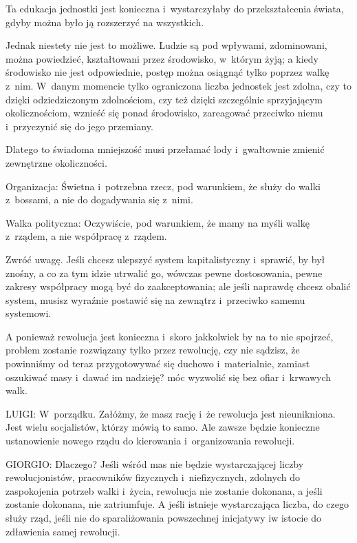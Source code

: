 \documentclass[oneside,polish,11pt,sfheadings]{mwbk}
\begin{document}
 
Ta edukacja jednostki jest konieczna i~wystarczyłaby do przekształcenia świata, gdyby można było ją rozszerzyć na
wszystkich. 

 
Jednak niestety nie jest to możliwe. Ludzie są pod wpływami, zdominowani, można powiedzieć, kształtowani przez
środowisko, w~którym żyją; a kiedy środowisko nie jest odpowiednie, postęp można osiągnąć tylko poprzez walkę z~nim. W~danym momencie tylko ograniczona liczba jednostek jest zdolna, czy to dzięki odziedziczonym zdolnościom, czy też dzięki
szczególnie sprzyjającym okolicznościom, wznieść się ponad środowisko, zareagować przeciwko niemu i~przyczynić się do
jego przemiany. 

 
Dlatego to świadoma mniejszość musi przełamać lody i~gwałtownie zmienić zewnętrzne okoliczności. 

 
Organizacja: Świetna i~potrzebna rzecz, pod warunkiem, że służy do walki z~bossami, a nie do dogadywania się z~nimi. 

 
Walka polityczna: Oczywiście, pod warunkiem, że mamy na myśli walkę z~rządem, a nie współpracę z~rządem. 

 
Zwróć uwagę. Jeśli chcesz ulepszyć system kapitalistyczny i~sprawić, by był znośny, a co za tym idzie utrwalić go,
wówczas pewne dostosowania, pewne zakresy współpracy mogą być do zaakceptowania; ale jeśli naprawdę chcesz obalić
system, musisz wyraźnie postawić się na zewnątrz i~przeciwko samemu systemowi. 

 
A ponieważ rewolucja jest konieczna i~skoro jakkolwiek by na to nie spojrzeć, problem zostanie rozwiązany tylko przez
rewolucję, czy nie sądzisz, że powinniśmy od teraz przygotowywać się duchowo i~materialnie, zamiast oszukiwać masy i~dawać im nadzieję? móc wyzwolić się bez ofiar i~krwawych walk. 




 
\noindent LUIGI: W~porządku. Załóżmy, że masz rację i~że rewolucja jest nieunikniona. Jest wielu socjalistów, którzy mówią to
samo. Ale zawsze będzie konieczne ustanowienie nowego rządu do kierowania i~organizowania rewolucji. 




 
\noindent GIORGIO: Dlaczego? Jeśli wśród mas nie będzie wystarczającej liczby rewolucjonistów, pracowników fizycznych i~niefizycznych, zdolnych do zaspokojenia potrzeb walki i~życia, rewolucja nie zostanie dokonana, a jeśli zostanie
dokonana, nie zatriumfuje. A jeśli istnieje wystarczająca liczba, do czego służy rząd, jeśli nie do sparaliżowania
powszechnej inicjatywy iw istocie do zdławienia samej rewolucji. 
\end{document}
